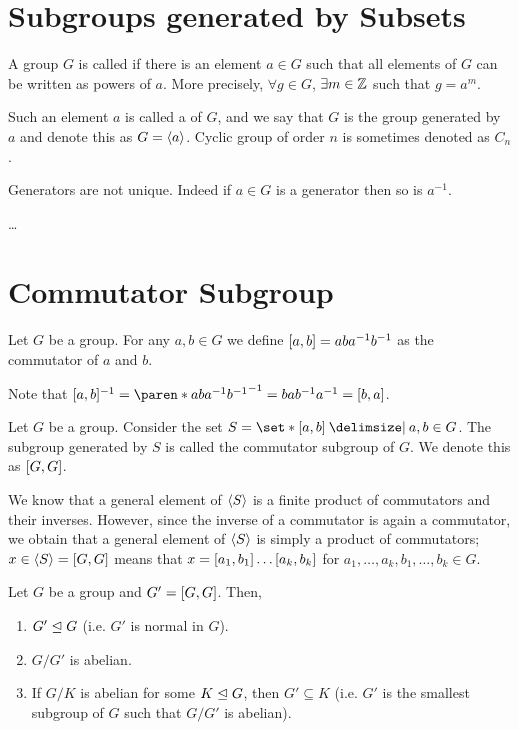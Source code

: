 \documentclass[11pt]{penrose}
\begin{document}
\section{Subgroups generated by Subsets}
\begin{ndfn}
    A group $G$ is called  if there is an element $a \in G$ such that all elements of $G$ can be written as powers of $a$. More precisely, $\forall g \in G$, $\exists m \in \mathbb{Z}$ such that $g = a^m$.

    Such an element $a$ is called a  of $G$, and we say that $G$ is the group generated by $a$ and denote this as $G = \langle a\rangle$. Cyclic group of order $n$ is sometimes denoted as $C_n$.
\end{ndfn}

Generators are not unique. Indeed if $a \in G$ is a generator then so is $a^{-1}$.

    
\dots

\section{Commutator Subgroup}
\begin{ndfn}
    Let $G$ be a group. For any $a,b \in G$ we define $\lbrack a,b\rbrack = aba^{-1}b^{-1}$ as the commutator of $a$ and $b$.
\end{ndfn}

Note that $\comm{a,b}^{-1} = \paren*{aba^{-1}b^{-1}}^{-1} = bab^{-1}a^{-1} = \comm{b,a}$.

\begin{ndfn}
    Let $G$ be a group. Consider the set $S = \set*{ \comm{a,b} \st a,b \in G }$. The subgroup generated by $S$ is called the commutator subgroup of $G$. We denote this as $\lbrack G,G\rbrack$.
\end{ndfn}

We know that a general element of $\langle S\rangle$ is a finite product of commutators and their inverses. However, since the inverse of a commutator is again a commutator, we obtain that a general element of $\langle S\rangle$ is simply a product of commutators; $x \in \langle S\rangle = \lbrack G,G\rbrack$ means that $x = \lbrack a_{1}, b_{1}\rbrack \dots \lbrack a_{k}, b_{k}\rbrack$ for $a_{1}, \dots, a_{k}, b_{1}, \dots, b_{k} \in G$.

\begin{nthm}
    Let $G$ be a group and $G' = \lbrack G,G\rbrack$. Then,
    \begin{enumerate}
        \item $G' \mathrel{\trianglelefteq} G$ (i.e. $G'$ is normal in $G$).
        \item $G / G'$ is abelian.
        \item If $G / K$ is abelian for some $K \mathrel{\trianglelefteq} G$, then $G' \subseteq K$ (i.e. $G'$ is the smallest subgroup of $G$ such that $G/G'$ is abelian).
    \end{enumerate}
\end{nthm}
\end{document}
